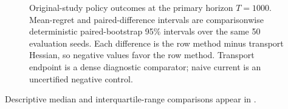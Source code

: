 \begin{figure}[p]
  \centering
  
  \caption{Original-study policy outcomes at the primary horizon $T=1000$.  Mean-regret and
  paired-difference intervals are comparisonwise deterministic paired-bootstrap
  95\% intervals over the same 50 evaluation seeds.  Each difference is the row
  method minus transport Hessian, so negative values favor the row method.
  Transport endpoint is a dense diagnostic comparator; naive current is an
  uncertified negative control.}
  \label{fig:transport-instantiation-performance}
\end{figure}

Descriptive median and interquartile-range comparisons appear in
.
